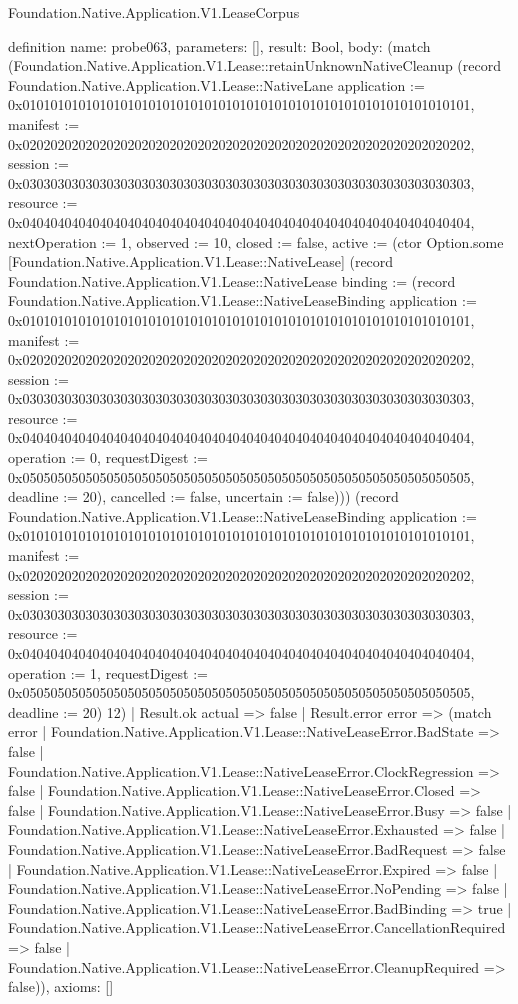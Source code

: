 \begin{lexlean}{Foundation.Native.Application.V1.LeaseCorpus}
\begin{semanticmodule}
definition{
  name: probe063,
  parameters: [],
  result: Bool,
  body: (match (Foundation.Native.Application.V1.Lease::retainUnknownNativeCleanup (record Foundation.Native.Application.V1.Lease::NativeLane {application := 0x0101010101010101010101010101010101010101010101010101010101010101, manifest := 0x0202020202020202020202020202020202020202020202020202020202020202, session := 0x0303030303030303030303030303030303030303030303030303030303030303, resource := 0x0404040404040404040404040404040404040404040404040404040404040404, nextOperation := 1, observed := 10, closed := false, active := (ctor Option.some [Foundation.Native.Application.V1.Lease::NativeLease] (record Foundation.Native.Application.V1.Lease::NativeLease {binding := (record Foundation.Native.Application.V1.Lease::NativeLeaseBinding {application := 0x0101010101010101010101010101010101010101010101010101010101010101, manifest := 0x0202020202020202020202020202020202020202020202020202020202020202, session := 0x0303030303030303030303030303030303030303030303030303030303030303, resource := 0x0404040404040404040404040404040404040404040404040404040404040404, operation := 0, requestDigest := 0x0505050505050505050505050505050505050505050505050505050505050505, deadline := 20}), cancelled := false, uncertain := false}))}) (record Foundation.Native.Application.V1.Lease::NativeLeaseBinding {application := 0x0101010101010101010101010101010101010101010101010101010101010101, manifest := 0x0202020202020202020202020202020202020202020202020202020202020202, session := 0x0303030303030303030303030303030303030303030303030303030303030303, resource := 0x0404040404040404040404040404040404040404040404040404040404040404, operation := 1, requestDigest := 0x0505050505050505050505050505050505050505050505050505050505050505, deadline := 20}) 12)
    | Result.ok actual => false
    | Result.error error => (match error
      | Foundation.Native.Application.V1.Lease::NativeLeaseError.BadState => false
      | Foundation.Native.Application.V1.Lease::NativeLeaseError.ClockRegression => false
      | Foundation.Native.Application.V1.Lease::NativeLeaseError.Closed => false
      | Foundation.Native.Application.V1.Lease::NativeLeaseError.Busy => false
      | Foundation.Native.Application.V1.Lease::NativeLeaseError.Exhausted => false
      | Foundation.Native.Application.V1.Lease::NativeLeaseError.BadRequest => false
      | Foundation.Native.Application.V1.Lease::NativeLeaseError.Expired => false
      | Foundation.Native.Application.V1.Lease::NativeLeaseError.NoPending => false
      | Foundation.Native.Application.V1.Lease::NativeLeaseError.BadBinding => true
      | Foundation.Native.Application.V1.Lease::NativeLeaseError.CancellationRequired => false
      | Foundation.Native.Application.V1.Lease::NativeLeaseError.CleanupRequired => false)),
  axioms: []
}


\end{semanticmodule}
\end{lexlean}
